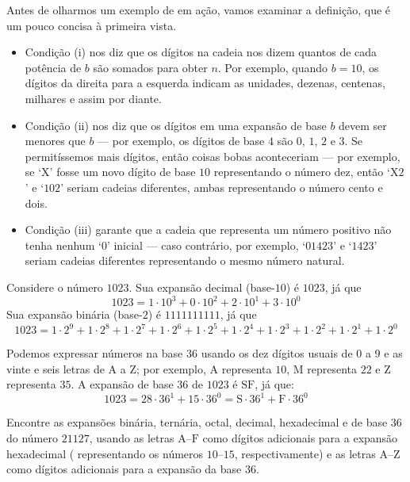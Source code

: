 Antes de olharmos um exemplo de  em ação, vamos examinar a definição, que é um pouco concisa à primeira vista.
\begin{itemize}
\item Condição (i) nos diz que os dígitos na cadeia nos dizem quantos de cada potência de $b$ são somados para obter $n$. Por exemplo, quando $b=10$, os dígitos da direita para a esquerda indicam as unidades, dezenas, centenas, milhares e assim por diante.
\item Condição (ii) nos diz que os dígitos em uma expansão de base $b$ devem ser menores que $b$ --- por exemplo, os dígitos de base $4$ são $0$, $1$, $2$ e $3$. Se permitíssemos mais dígitos, então coisas bobas aconteceriam --- por exemplo, se `$\mathrm{X}$' fosse um novo dígito de base $10$ representando o número dez, então `$\mathrm{X}2$' e `$102$' seriam cadeias diferentes, ambas representando o número cento e dois.
\item Condição (iii) garante que a cadeia que representa um número positivo não tenha nenhum `$0$' inicial --- caso contrário, por exemplo, `$01423$' e `$1423$' seriam cadeias diferentes representando o mesmo número natural.
\end{itemize}

\begin{example}
Considere o número $1023$. Sua expansão decimal (base-$10$) é $1023$, já que
\[ 1023 = 1 \cdot 10^3 + 0 \cdot 10^2 + 2 \cdot 10^1 + 3 \cdot 10^0 \]
Sua expansão binária (base-$2$) é $1111111111$, já que\[ 1023 = 1 \cdot 2^9 + 1 \cdot 2^8 + 1 \cdot 2^7 + 1 \cdot 2^6 + 1 \cdot 2^5 + 1 \cdot 2^4 + 1 \cdot 2^3 + 1 \cdot 2^2 + 1 \cdot 2^1 + 1 \cdot 2^0 \]

Podemos expressar números na base $36$ usando os dez dígitos usuais de $0$ a $9$ e as vinte e seis letras de $\mathrm{A}$ a $\mathrm{Z}$; por exemplo, $\mathrm{A}$ representa $10$, $\mathrm{M}$ representa $22$ e $\mathrm{Z}$ representa $35$. A expansão de base $36$ de $1023$ é $\mathrm{SF}$, já que:
\[ 1023 = 28 \cdot 36^1 + 15 \cdot 36^0 = \mathrm{S} \cdot 36^1 + \mathrm{F} \cdot 36^0 \]
\end{example}

\begin{exercise}
Encontre as expansões binária, ternária, octal, decimal, hexadecimal e de base $36$ do número $21127$, usando as letras $\mathrm{A}$--$\mathrm{F}$ como dígitos adicionais para a expansão hexadecimal ( representando os números $10$--$15$, respectivamente) e as letras $\mathrm{A}$--$\mathrm{Z}$ como dígitos adicionais para a expansão da base $36$.
\end{exercise}


